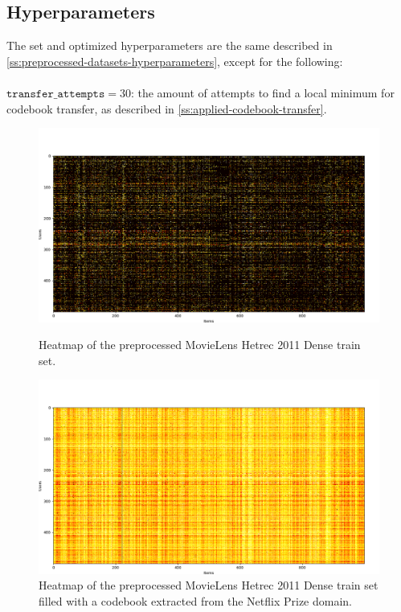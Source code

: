 \subsection{Hyperparameters}

The set and optimized hyperparameters are the same described in \autoref{ss:preprocessed-datasets-hyperparameters}, except for the following:\\\\
$\texttt{transfer\_attempts} = 30$: the amount of attempts to find a local minimum for codebook transfer, as described in \autoref{ss:applied-codebook-transfer}.


\begin{figure}[hbt!]
\centering
\includegraphics[width=\textwidth]{pictures/movielens-target}
\caption{Heatmap of the preprocessed MovieLens Hetrec 2011 Dense train set.}
\includegraphics[width=\textwidth]{pictures/movielens-target-filled}
\caption{Heatmap of the preprocessed MovieLens Hetrec 2011 Dense train set filled with a codebook extracted from the Netflix Prize domain.}
\end{figure}


